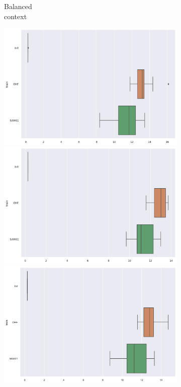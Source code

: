 \documentclass{article}
\theoremstyle{definition}
\begin{document}
\begin{figure}[ht]
\begin{subfigure}[b]{0.15\textwidth}
         \caption{Balanced \\ context}
         \label{Prediction_Bal_X_Lat}
     \end{subfigure}
     \begin{subfigure}[b]{0.15\textwidth}
         \centering
         \includegraphics[width=\textwidth]{imgs/Illu/1000Epochs/Majo/Boxplots_predTest_Lat.png}
         \quad
         \includegraphics[width=\textwidth]{imgs/Illu/2000Epochs/Majo/Boxplots_predTest_Lat.png}
         \quad
         \includegraphics[width=\textwidth]{imgs/Illu/3000Epochs/Majo/Boxplots_predTest_Lat.png}

\end{subfigure}
\end{figure}
\end{document}
